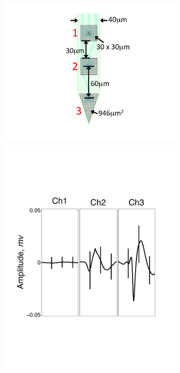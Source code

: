 \begin{center}
\begin{figure}
\begin{subfigure}[b]{.12\textwidth}
\includegraphics[width=1\textwidth]{../figs/3dev}
\caption{}
\label{3dev}
\end{subfigure}
\begin{subfigure}[b]{.28\textwidth}
\includegraphics[width=\textwidth]{../figs/3devim/clus1}

\end{subfigure}
\end{figure}
\end{center}
